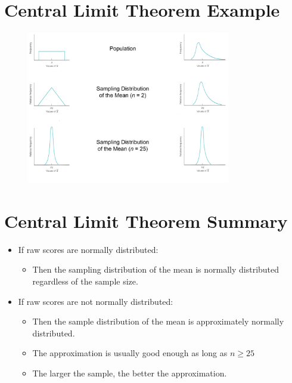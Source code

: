 \documentclass[12pt]{article}
\begin{document}
\section{Central Limit Theorem
Example}\label{central-limit-theorem-example}

\begin{figure}[H]
\centering
\includegraphics[width=3.5in]{CLT_example.png}
\caption{}
\end{figure}

\section{Central Limit Theorem
Summary}\label{central-limit-theorem-summary}

\begin{itemize}
\itemsep1pt\parskip0pt
\item
  If raw scores are normally distributed:

  \begin{itemize}
  \itemsep1pt\parskip0pt
  \item
    Then the sampling distribution of the mean is normally distributed
    regardless of the sample size.
  \end{itemize}
\item
  If raw scores are not normally distributed:

  \begin{itemize}
  \itemsep1pt\parskip0pt
  \item
    Then the sample distribution of the mean is approximately normally
    distributed.
  \item
    The approximation is usually good enough as long as \(n \geq 25\)
  \item
    The larger the sample, the better the approximation.
  \end{itemize}
\end{itemize}
\end{document}
